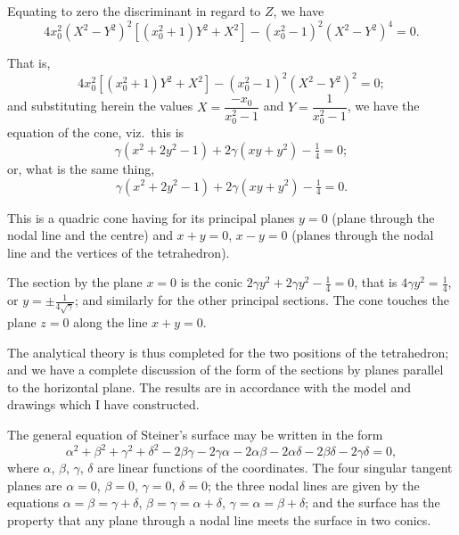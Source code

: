 \documentclass[12pt,a4paper]{article}
\theoremstyle{plain}
\theoremstyle{definition}
\begin{document}
Equating to zero the discriminant in regard to $Z$, we have
\[
4x_0^2(X^2 - Y^2)^2[(x_0^2 + 1)Y^2 + X^2] - (x_0^2 - 1)^2(X^2 - Y^2)^4 = 0.
\]

That is,
\[
4x_0^2[(x_0^2 + 1)Y^2 + X^2] - (x_0^2 - 1)^2(X^2 - Y^2)^2 = 0;
\]
and substituting herein the values $X = \dfrac{-x_0}{x_0^2 - 1}$ and $Y = \dfrac{1}{x_0^2 - 1}$, we have the equation of the cone, viz.\ this is
\[
\gamma(x^2 + 2y^2 - 1) + 2\gamma(xy + y^2) - \tfrac{1}{4} = 0;
\]
or, what is the same thing,
\[
\gamma(x^2 + 2y^2 - 1) + 2\gamma(xy + y^2) - \tfrac{1}{4} = 0.
\]

\newpage
\setcounter{page}{10}

This is a quadric cone having for its principal planes $y = 0$ (plane through the nodal line and the centre) and $x + y = 0$, $x - y = 0$ (planes through the nodal line and the vertices of the tetrahedron).

The section by the plane $x = 0$ is the conic $2\gamma y^2 + 2\gamma y^2 - \tfrac{1}{4} = 0$, that is $4\gamma y^2 = \tfrac{1}{4}$, or $y = \pm \tfrac{1}{4\sqrt{\gamma}}$; and similarly for the other principal sections. The cone touches the plane $z = 0$ along the line $x + y = 0$.

\newpage
\setcounter{page}{11}

The analytical theory is thus completed for the two positions of the tetrahedron; and we have a complete discussion of the form of the sections by planes parallel to the horizontal plane. The results are in accordance with the model and drawings which I have constructed.

\newpage
\setcounter{page}{12}

The general equation of Steiner's surface may be written in the form
\[
\alpha^2 + \beta^2 + \gamma^2 + \delta^2 - 2\beta\gamma - 2\gamma\alpha - 2\alpha\beta - 2\alpha\delta - 2\beta\delta - 2\gamma\delta = 0,
\]
where $\alpha$, $\beta$, $\gamma$, $\delta$ are linear functions of the coordinates. The four singular tangent planes are $\alpha = 0$, $\beta = 0$, $\gamma = 0$, $\delta = 0$; the three nodal lines are given by the equations $\alpha = \beta = \gamma + \delta$, $\beta = \gamma = \alpha + \delta$, $\gamma = \alpha = \beta + \delta$; and the surface has the property that any plane through a nodal line meets the surface in two conics.

\end{document}
